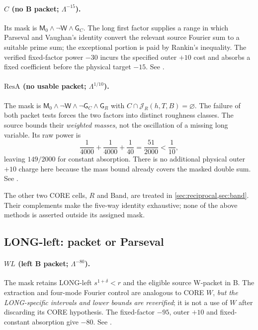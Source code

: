 \documentclass[11pt]{article}
\newcommand{\Lam}{\Lambda}
\newcommand{\JR}{\mathcal J_R}
\theoremstyle{definition}
\theoremstyle{remark}
\newcommand{\1}{\mathbf 1}
\begin{document}
\paragraph{$C$ (no B packet; $\Lam^{-15}$).}
Its mask is $\mathsf M_0\wedge\neg\mathsf W
\wedge\mathsf G_C$. The long first factor supplies a
range in which Parseval and Vaughan's identity convert
the relevant source Fourier sum to a suitable prime sum;
the exceptional portion is paid by Rankin's inequality.
The verified fixed-factor power $-30$ incurs the
specified outer $+10$ cost and absorbs a fixed coefficient
before the physical target $-15$.
See .

\paragraph{$\mathrm{ResA}$ (no usable packet; $\Lam^{1/10}$).}
The mask is $\mathsf M_0\wedge\neg\mathsf W
\wedge\neg\mathsf G_C\wedge\mathsf G_R$
with $C\cap\JR(h,T,B)=\varnothing$. The failure of both
packet tests forces the two factors into distinct roughness
classes. The source bounds their \emph{weighted masses},
not the oscillation of a missing long variable. Its raw
power is
\[
 \frac1{4000}+\frac1{4000}+\frac1{40}
   =\frac{51}{2000}<\frac1{10},
\]
leaving $149/2000$ for constant absorption. There is no
additional physical outer $+10$ charge here because the
mass bound already covers the masked double sum.
See .

The other two CORE cells, $R$ and Band, are treated in
\cref{sec:reciprocal,sec:band}. Their complements make
the five-way identity exhaustive; none of the above
methods is asserted outside its assigned mask.

\subsection{LONG-left: packet or Parseval}

\paragraph{$WL$ (left B packet; $\Lam^{-80}$).}
The mask retains LONG-left $s^{1+\delta}<r$ and the
eligible source W-packet in B. The extraction and
four-mode Fourier control are analogous to CORE $W$,
\emph{but the LONG-specific intervals and lower bounds
are reverified}; it is not a use of $W$ after discarding
its CORE hypothesis. The fixed-factor $-95$, outer $+10$
and fixed-constant absorption give $-80$.
See .
\end{document}
